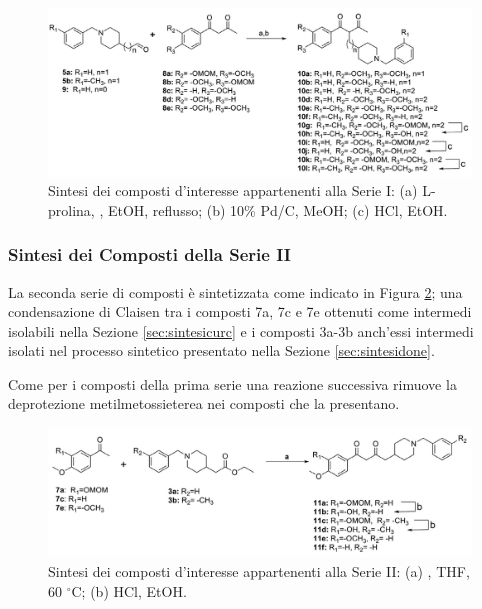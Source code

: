 \documentclass[a4paper, 12pt]{article}
\begin{document}
\begin{figure}[H]
	\centering
	\includegraphics[width=\linewidth]{immagini/condserie1_curcdone.png}
	\caption{Sintesi dei composti d'interesse appartenenti alla Serie I: (a) L-prolina,  , EtOH, reflusso; (b) 10\% Pd/C, MeOH; (c) HCl, EtOH.}
	\label{fig:condserie1_curcdone}
\end{figure}

\subsubsection{Sintesi dei Composti della Serie II}
\label{sec:condserie2}
La seconda serie di composti è sintetizzata come indicato in Figura \ref{fig:condserie2_curcdone}; una condensazione di Claisen tra i composti 7a, 7c e 7e ottenuti come intermedi isolabili nella Sezione \ref{sec:sintesicurc} e i composti 3a-3b anch'essi intermedi isolati nel processo sintetico presentato nella Sezione \ref{sec:sintesidone}.

Come per i composti della prima serie una reazione successiva rimuove la deprotezione metilmetossieterea nei composti che la presentano.

\begin{figure}[H]
	\centering
	\includegraphics[width=\linewidth]{immagini/condserie2_curcdone.png}
	\caption{Sintesi dei composti d'interesse appartenenti alla Serie II: (a)  , THF, 60 $^\circ$C; (b) HCl, EtOH.}
	\label{fig:condserie2_curcdone}
\end{figure}
\end{document}
